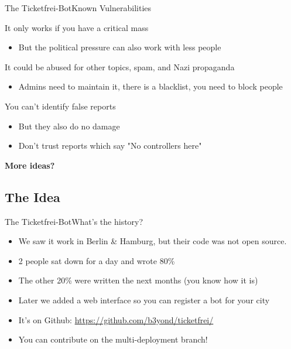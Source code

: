\documentclass[10pt]{beamer}
\begin{document}
{\begin{frame}{The Ticketfrei-Bot}{Known Vulnerabilities}
\begin{block}{It only works if you have a critical mass}
  \begin{itemize}
    \item But the political pressure can also work with less people
  \end{itemize}
\end{block}

\begin{block}{It could be abused for other topics, spam, and Nazi propaganda}
  \begin{itemize}
    \item Admins need to maintain it, there is a blacklist, you need to block people
  \end{itemize}
\end{block}

\begin{block}{You can't identify false reports}
  \begin{itemize}
    \item But they also do no damage
    \item Don't trust reports which say "No controllers here"
  \end{itemize}
\end{block}

\textbf{More ideas?}

\end{frame}

\subsection{The Idea}
\begin{frame}{The Ticketfrei-Bot}{What's the history?}

\begin{itemize}
    \item We saw it work in Berlin \& Hamburg, but their code was not open source.
    \item 2 people sat down for a day and wrote 80\%
    \item The other 20\% were written the next months (you know how it is)
    \item Later we added a web interface so you can register a bot for your city
    \item<2-> It's on Github: \url{https://github.com/b3yond/ticketfrei/}
    \item<2-> You can contribute on the multi-deployment branch!
\end{itemize}
    

\end{frame}}
\end{document}
